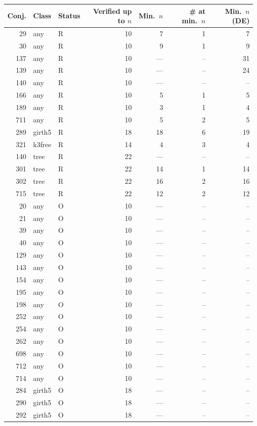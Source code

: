 \begin{tabular}{rllrrrr}
\hline
Conj. & Class & Status & Verified up to $n$ & Min.\ $n$ & \# at min.\ $n$ & Min.\ $n$ (DE) \\
\hline
29 & any & R & 10 & 7 & 1 & 7 \\
30 & any & R & 10 & 9 & 1 & 9 \\
137 & any & R & 10 & — & -- & 31 \\
139 & any & R & 10 & — & -- & 24 \\
140 & any & R & 10 & — & -- & -- \\
166 & any & R & 10 & 5 & 1 & 5 \\
189 & any & R & 10 & 3 & 1 & 4 \\
711 & any & R & 10 & 5 & 2 & 5 \\
289 & girth5 & R & 18 & 18 & 6 & 19 \\
321 & k3free & R & 14 & 4 & 3 & 4 \\
140 & tree & R & 22 & — & -- & -- \\
301 & tree & R & 22 & 14 & 1 & 14 \\
302 & tree & R & 22 & 16 & 2 & 16 \\
715 & tree & R & 22 & 12 & 2 & 12 \\
20 & any & O & 10 & — & -- & -- \\
21 & any & O & 10 & — & -- & -- \\
39 & any & O & 10 & — & -- & -- \\
40 & any & O & 10 & — & -- & -- \\
129 & any & O & 10 & — & -- & -- \\
143 & any & O & 10 & — & -- & -- \\
154 & any & O & 10 & — & -- & -- \\
195 & any & O & 10 & — & -- & -- \\
198 & any & O & 10 & — & -- & -- \\
252 & any & O & 10 & — & -- & -- \\
254 & any & O & 10 & — & -- & -- \\
262 & any & O & 10 & — & -- & -- \\
698 & any & O & 10 & — & -- & -- \\
712 & any & O & 10 & — & -- & -- \\
714 & any & O & 10 & — & -- & -- \\
284 & girth5 & O & 18 & — & -- & -- \\
290 & girth5 & O & 18 & — & -- & -- \\
292 & girth5 & O & 18 & — & -- & -- \\

\end{tabular}
